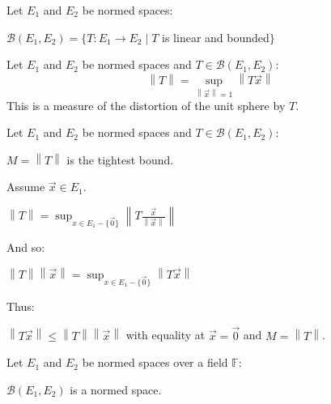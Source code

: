 \documentclass[letterpaper,12pt,fleqn]{article}
\newcommand{\vx}{\vec{x}}
\newcommand{\vo}{\vec{0}}
\newcommand{\norm}[1]{\left\|#1\right\|}
\renewcommand{\b}{\beta}
\renewcommand{\b}{\mathcal{B}}
\newcommand{\F}{\mathbb{F}}
\begin{document}
\begin{notation}
  Let $E_1$ and $E_2$ be normed spaces:
  
  \qquad$\b(E_1,E_2)=\{T:E_1\to E_2\mid T$ is linear and bounded$\}$
\end{notation}

\begin{definition}
  Let $E_1$ and $E_2$ be normed spaces and $T\in\b(E_1,E_2)$:
  \[\norm{T}=\sup_{\norm{\vx}=1}\norm{T\vx}\]
  This is a measure of the distortion of the unit sphere by $T$.
\end{definition}

\begin{theorem}
  Let $E_1$ and $E_2$ be normed spaces and $T\in\b(E_1,E_2)$:

  \qquad$M=\norm{T}$ is the tightest bound.
\end{theorem}

\begin{theproof}
  Assume $\vx\in E_1$.
  
  $\norm{T}=\sup_{x\in E_1-\{\vo\}}\norm{T\frac{\vx}{\norm{\vx}}}$

  And so:

  $\norm{T}\norm{\vx}=\sup_{x\in E_1-\{\vo\}}\norm{T\vx}$

  Thus:

  $\norm{T\vx}\le\norm{T}\norm{\vx}$ with equality at $\vx=\vo$ and
  $M=\norm{T}$.
\end{theproof}

\begin{theorem}
  Let $E_1$ and $E_2$ be normed spaces over a field $\F$:

  \qquad$\b(E_1,E_2)$ is a normed space.
\end{theorem}
\end{document}
